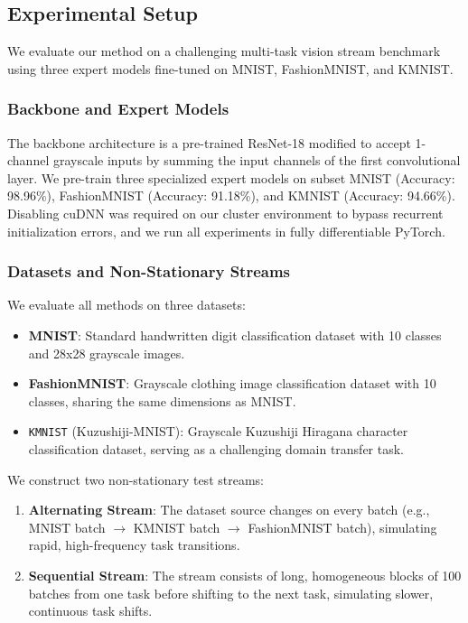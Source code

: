\documentclass{article}
\theoremstyle{plain}
\theoremstyle{definition}
\theoremstyle{remark}
\begin{document}
\subsection{Experimental Setup}
We evaluate our method on a challenging multi-task vision stream benchmark using three expert models fine-tuned on MNIST, FashionMNIST, and KMNIST. 

\subsubsection{Backbone and Expert Models}
The backbone architecture is a pre-trained ResNet-18 modified to accept 1-channel grayscale inputs by summing the input channels of the first convolutional layer. We pre-train three specialized expert models on subset MNIST (Accuracy: 98.96\%), FashionMNIST (Accuracy: 91.18\%), and KMNIST (Accuracy: 94.66\%). Disabling cuDNN was required on our cluster environment to bypass recurrent initialization errors, and we run all experiments in fully differentiable PyTorch.

\subsubsection{Datasets and Non-Stationary Streams}
We evaluate all methods on three datasets:
\begin{itemize}
    \item \textbf{MNIST}: Standard handwritten digit classification dataset with 10 classes and 28x28 grayscale images.
    \item \textbf{FashionMNIST}: Grayscale clothing image classification dataset with 10 classes, sharing the same dimensions as MNIST.
    \item \texttt{KMNIST} (Kuzushiji-MNIST): Grayscale Kuzushiji Hiragana character classification dataset, serving as a challenging domain transfer task.
\end{itemize}

We construct two non-stationary test streams:
\begin{enumerate}
    \item \textbf{Alternating Stream}: The dataset source changes on every batch (e.g., MNIST batch $\rightarrow$ KMNIST batch $\rightarrow$ FashionMNIST batch), simulating rapid, high-frequency task transitions.
    \item \textbf{Sequential Stream}: The stream consists of long, homogeneous blocks of 100 batches from one task before shifting to the next task, simulating slower, continuous task shifts.
\end{enumerate}
\end{document}
